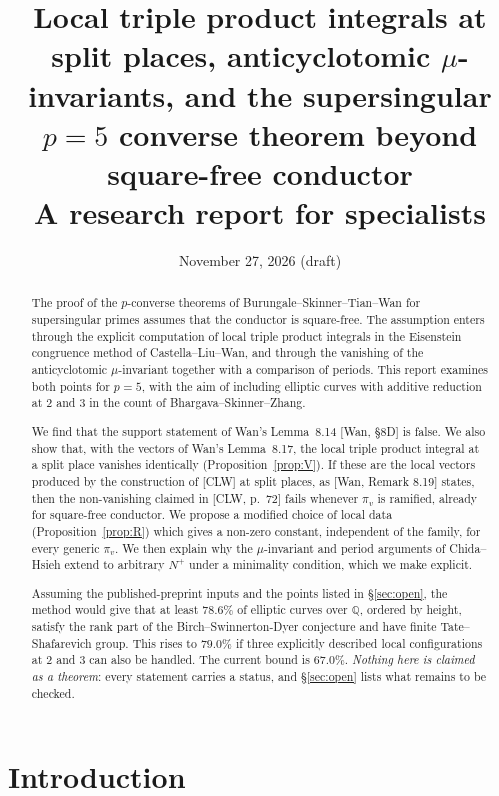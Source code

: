 \documentclass[11pt]{amsart}
\title[Split places and the supersingular $p=5$ converse beyond square-free level]{Local triple product integrals at split places, anticyclotomic $\mu$-invariants, and the supersingular $p=5$ converse theorem beyond square-free conductor\\[4pt] \normalfont\small A research report for specialists}
\date{November 27, 2026 (draft)}
\theoremstyle{definition}
\theoremstyle{remark}
\newcommand{\Q}{\mathbb{Q}}
\begin{document}
\begin{abstract}
The proof of the $p$-converse theorems of Burungale--Skinner--Tian--Wan for supersingular primes assumes that the conductor is square-free. The assumption enters through the explicit computation of local triple product integrals in the Eisenstein congruence method of Castella--Liu--Wan, and through the vanishing of the anticyclotomic $\mu$-invariant together with a comparison of periods. This report examines both points for $p=5$, with the aim of including elliptic curves with additive reduction at $2$ and $3$ in the count of Bhargava--Skinner--Zhang.

We find that the support statement of Wan's Lemma~8.14 [Wan, \S 8D] is false. We also show that, with the vectors of Wan's Lemma~8.17, the local triple product integral at a split place vanishes identically (Proposition~\ref{prop:V}). If these are the local vectors produced by the construction of [CLW] at split places, as [Wan, Remark 8.19] states, then the non-vanishing claimed in [CLW, p.~72] fails whenever $\pi_v$ is ramified, already for square-free conductor. We propose a modified choice of local data (Proposition~\ref{prop:R}) which gives a non-zero constant, independent of the family, for every generic $\pi_v$. We then explain why the $\mu$-invariant and period arguments of Chida--Hsieh extend to arbitrary $N^+$ under a minimality condition, which we make explicit.

Assuming the published-preprint inputs and the points listed in \S\ref{sec:open}, the method would give that at least $78.6\%$ of elliptic curves over $\Q$, ordered by height, satisfy the rank part of the Birch--Swinnerton-Dyer conjecture and have finite Tate--Shafarevich group. This rises to $79.0\%$ if three explicitly described local configurations at $2$ and $3$ can also be handled. The current bound is $67.0\%$. \emph{Nothing here is claimed as a theorem}: every statement carries a status, and \S\ref{sec:open} lists what remains to be checked.
\end{abstract}

\maketitle
\tableofcontents

\section{Introduction}
\end{document}

